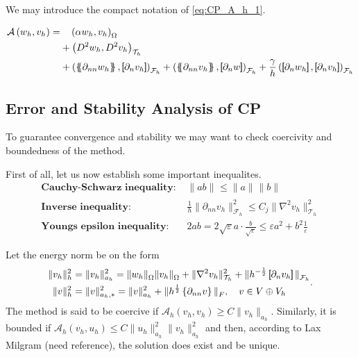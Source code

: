 We may introduce the compact notation of \eqref{eq:CP_A_h_1}.

\begin{equation}
\label{eq:CP_A_h}
\begin{split}
\mathcal{A} \left( w_{h}, v_{h} \right)   =&
  \quad  \left( \alpha  w_{h}, v_{h} \right) _{\Omega }\\
&  +  \left( D^2 w_{h}, D^2v_{h} \right) _{\mathcal{T} _{h}} \\
 & +
  \left( \mean{  \partial _{n n} w_{h} }, \jump{ \partial _{n }v_{h}} \right)_{\mathcal{F}_{h}}  +
 \left( \mean{ \partial _{n n} v_{h} }, \jump{ \partial _{n}w }      \right)_{\mathcal{F}_{h}}
+ \frac{\gamma }{h}  \left( \jump{ \partial _{n} w_{h}}, \jump{ \partial _{n} v_{h}   }   \right)_{\mathcal{F}_{h}}
\end{split}
\end{equation}

\subsection{Error and Stability Analysis of CP}%
\label{sub:error_and_stability_analysis_of_c0ip}

To guarantee convergence and stability we may want to check coercivity and boundedness of the method.

First of all, let us now establish some important inequalites.
\[
\begin{split}
    \textbf{Cauchy-Schwarz inequality: } & \| ab \|_{  }^{  }  \le \| a \|_{  }^{  } \| b \|_{  }^{  }   \\
    \textbf{Inverse inequality: } & \frac{1}{h}\| \partial _{nn}  v_{h} \|_{\mathcal{F}_{h}   }^{2  }  \le C_{j} \| \nabla ^2 v_{h} \|_{ \mathcal{T} _{h} }^{ 2 }   \\
    \textbf{Youngs epsilon inequality: } & 2ab =   2\sqrt{\varepsilon }a\cdot    \frac{b}{\sqrt{\varepsilon } } \le \varepsilon a^2+ b^2 \frac{1}{\varepsilon }
\end{split}
\]

Let the energy norm be on the form
\begin{equation}
\label{eq:A_energy_norm}
    \begin{split}
\| v_{h} \|_{ h }^{2  } & = \| v_{h} \|_{ a_{h} }^{ 2 } =  \|  w_{h} \|_{ \Omega  }^{  }\| v_{h} \|_{ \Omega  }^{  }  +  \| \nabla ^2 v_{h} \|_{ \mathcal{T} _{h}  }^{ 2 }  + \|  h^{-\frac{1}{2}} \left[\!\!\left[  \partial _{n} v_{h}     \right]\!\!\right]\|_{  \mathcal{F} _{h} }^{  } \\
\| v \|_{ h }^{ 2 }  &= \| v \|_{ a_{h},* }^{ 2 } = \| v \|_{ a_{h} }^{ 2 }  + \| h^{\frac{1}{2}} \left\{ \partial _{nn } v\right\}  \|_{ F  }^{  }, \quad  v\in V \oplus V_{h}
    \end{split}
.\end{equation}
The method is said to be coercive if $\mathcal{A} _{h}\left( v_{h}, v_{h} \right) \ge  C \| v_{h} \|_{ a_{h} }^{  } $. Similarly, it is bounded if $ \mathcal{A} _{h} \left( v_{h}, u_{h} \right) \le  C \| u_{h} \|_{  a_{h}}^{ 2 }  \| v_{h} \|_{ a_{h}
}^{ 2 } $ and then, according to Lax Milgram (need reference), the solution does exist and be unique.

